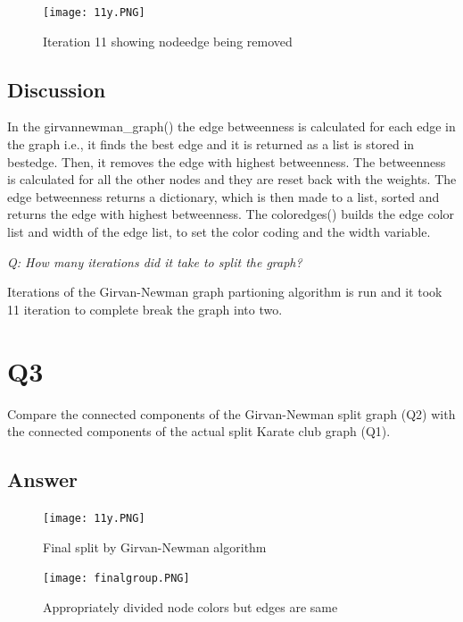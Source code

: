 \documentclass[12pt]{article}
\begin{document}
\begin{figure}[h]
    \centering
    \texttt{[image: 11y.PNG]}
    \caption{Iteration 11 showing nodeedge being removed}
    \label{fig:web-growth}
\end{figure}

\clearpage
\subsection*{Discussion}
In the girvannewman\_graph() the edge betweenness is calculated for each edge in the graph i.e., it finds the best edge and it is returned as a list is stored in bestedge. Then, it removes the edge with highest betweenness. The betweenness is calculated for all the other nodes and they are reset back with the weights. The edge betweenness returns a dictionary, which is then made to a list, sorted and returns the edge with highest betweenness. The coloredges() builds the edge color list and width of the edge list, to set the color coding and the width variable. 


\emph{Q: How many iterations did it take to split the graph?}

Iterations of the Girvan-Newman graph partioning algorithm is run and it took 11 iteration to complete break the graph into two. 

\section*{Q3}
Compare the connected components of the Girvan-Newman split graph (Q2) with the connected components of the actual split Karate club graph (Q1).

\subsection*{Answer}
\begin{figure}[h]
    \centering
    \texttt{[image: 11y.PNG]}
    \caption{Final split by Girvan-Newman algorithm}
    \label{fig:web-growth}
\end{figure}
\clearpage
\begin{figure}[h]
    \centering
    \texttt{[image: finalgroup.PNG]}
    \caption{Appropriately divided node colors but edges are same}
    \label{fig:web-growth}
\end{figure}
\end{document}
